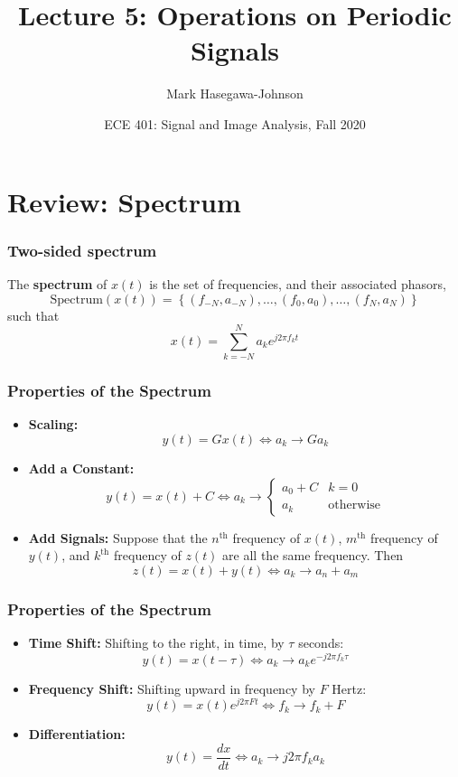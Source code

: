 \documentclass{beamer}
\title{Lecture 5: Operations on Periodic Signals}
\author{Mark Hasegawa-Johnson}
\date{ECE 401: Signal and Image Analysis, Fall 2020}
\begin{document}
\begin{frame}
  \maketitle
\end{frame}

\begin{frame}
  \tableofcontents
\end{frame}

\section[Spectrum]{Review: Spectrum}
\setcounter{subsection}{1}

\begin{frame}
  \frametitle{Two-sided spectrum}

  The {\bf spectrum} of $x(t)$ is the set of frequencies, and their
  associated phasors,
  \[
  \mbox{Spectrum}\left( x(t) \right) =
  \left\{ (f_{-N},a_{-N}), \ldots, (f_0,a_0), \ldots, (f_N,a_N) \right\}
  \]
  such that
  \[
  x(t) = \sum_{k=-N}^N a_ke^{j2\pi f_kt}
  \]
\end{frame}

\begin{frame}
  \frametitle{Properties of the Spectrum}
  \begin{itemize}
  \item {\bf Scaling:}
    \[
    y(t) = Gx(t)\Leftrightarrow a_k \rightarrow Ga_k
    \]
  \item {\bf Add a Constant:}
    \[
    y(t)=x(t)+C \Leftrightarrow
    a_k \rightarrow \begin{cases}
      a_0+C & k=0 \\
      a_k & \mbox{otherwise}
    \end{cases}
    \]
  \item {\bf Add Signals:} Suppose that the $n^{\textrm{th}}$ frequency
    of $x(t)$, $m^{\textrm{th}}$ frequency of $y(t)$, and
    $k^{\textrm{th}}$ frequency of $z(t)$ are all the same frequency.  Then 
    \[
    z(t)=x(t)+y(t)
    \Leftrightarrow
    a_k \rightarrow a_n+a_m
    \]
  \end{itemize}
\end{frame}

\begin{frame}
  \frametitle{Properties of the Spectrum}
  \begin{itemize}
  \item {\bf Time Shift:} Shifting to the right, in time, by $\tau$
    seconds:
    \[
    y(t)=x(t-\tau)\Leftrightarrow a_k\rightarrow a_k e^{-j2\pi f_k\tau}
    \]
  \item {\bf Frequency Shift:} Shifting upward in frequency by $F$
    Hertz:
    \[
    y(t)=x(t)e^{j2\pi Ft} \Leftrightarrow f_k\rightarrow f_k+F
    \]
  \item {\bf Differentiation:}
    \[
    y(t) = \frac{dx}{dt} \Leftrightarrow a_k\rightarrow j2\pi f_k a_k
    \]
  \end{itemize}
\end{frame}  
\end{document}
